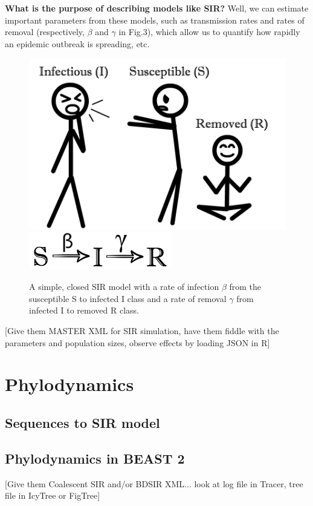 \documentclass{scrartcl}
\begin{document}
\vspace{3mm}
\textbf{What is the purpose of describing models like SIR?}  Well, we can estimate important parameters from these models, such as transmission rates and rates of removal 
(respectively, $\beta$ and $\gamma$ in Fig.3), which allow us to quantify how rapidly an epidemic outbreak is spreading, etc.

\begin{figure}[H] 
\center
\quad
{\includegraphics[width=0.4\linewidth]{SIR.jpg}}
\quad
{\includegraphics[width=0.25\linewidth]{SIRgraphic.jpg}}
\caption{A simple, closed SIR model with a rate of infection $\beta$ from the susceptible S to infected I class and a rate of removal $\gamma$ from infected I to removed R class.}
\label{sequences}
\end{figure}

[Give them MASTER XML for SIR simulation, have them fiddle with the parameters and population sizes, observe effects by loading JSON in R]

\section{Phylodynamics}

\subsection{Sequences to SIR model}

\subsection{Phylodynamics in BEAST 2}

[Give them Coalescent SIR and/or BDSIR XML... look at log file in Tracer, tree file in IcyTree or FigTree]

\newpage
\begin{thebibliography}{99} %

 
\end{thebibliography}

\end{document}
